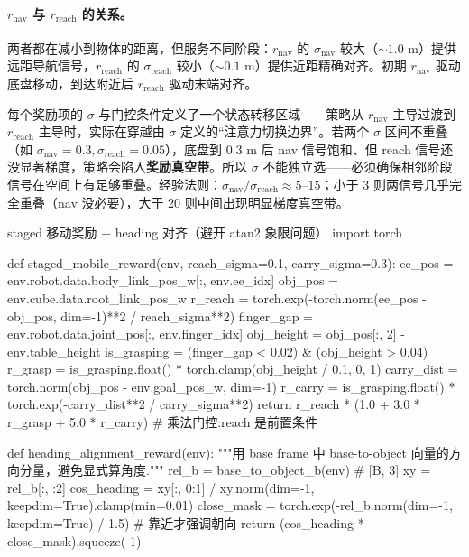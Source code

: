 \paragraph{$r_{\text{nav}}$ 与 $r_{\text{reach}}$ 的关系。}两者都在减小到物体的距离，但服务不同阶段：$r_{\text{nav}}$ 的 $\sigma_{\text{nav}}$ 较大（$\sim 1.0$ m）提供远距导航信号，$r_{\text{reach}}$ 的 $\sigma_{\text{reach}}$ 较小（$\sim 0.1$ m）提供近距精确对齐。初期 $r_{\text{nav}}$ 驱动底盘移动，到达附近后 $r_{\text{reach}}$ 驱动末端对齐。

\begin{insight}\label{ins:rlmc-wh-vacuum}
每个奖励项的 $\sigma$ 与门控条件定义了一个状态转移区域——策略从 $r_{\text{nav}}$ 主导过渡到 $r_{\text{reach}}$ 主导时，实际在穿越由 $\sigma$ 定义的“注意力切换边界”。若两个 $\sigma$ 区间不重叠（如 $\sigma_{\text{nav}}=0.3,\sigma_{\text{reach}}=0.05$），底盘到 $0.3$ m 后 nav 信号饱和、但 reach 信号还没显著梯度，策略会陷入\textbf{奖励真空带}。所以 $\sigma$ 不能独立选——必须确保相邻阶段信号在空间上有足够重叠。经验法则：$\sigma_{\text{nav}}/\sigma_{\text{reach}}\approx 5$--$15$；小于 3 则两信号几乎完全重叠（nav 没必要），大于 20 则中间出现明显梯度真空带。
\end{insight}

\begin{codebox}[Python]{staged 移动奖励 + heading 对齐（避开 atan2 象限问题）}
import torch

def staged_mobile_reward(env, reach_sigma=0.1, carry_sigma=0.3):
    ee_pos  = env.robot.data.body_link_pos_w[:, env.ee_idx]
    obj_pos = env.cube.data.root_link_pos_w
    r_reach = torch.exp(-torch.norm(ee_pos - obj_pos, dim=-1)**2 / reach_sigma**2)
    finger_gap = env.robot.data.joint_pos[:, env.finger_idx]
    obj_height = obj_pos[:, 2] - env.table_height
    is_grasping = (finger_gap < 0.02) & (obj_height > 0.04)
    r_grasp = is_grasping.float() * torch.clamp(obj_height / 0.1, 0, 1)
    carry_dist = torch.norm(obj_pos - env.goal_pos_w, dim=-1)
    r_carry = is_grasping.float() * torch.exp(-carry_dist**2 / carry_sigma**2)
    return r_reach * (1.0 + 3.0 * r_grasp + 5.0 * r_carry)   # 乘法门控:reach 是前置条件

def heading_alignment_reward(env):
    """用 base frame 中 base-to-object 向量的方向分量，避免显式算角度."""
    rel_b = base_to_object_b(env)                          # [B, 3]
    xy = rel_b[:, :2]
    cos_heading = xy[:, 0:1] / xy.norm(dim=-1, keepdim=True).clamp(min=0.01)
    close_mask  = torch.exp(-rel_b.norm(dim=-1, keepdim=True) / 1.5)  # 靠近才强调朝向
    return (cos_heading * close_mask).squeeze(-1)
\end{codebox}

